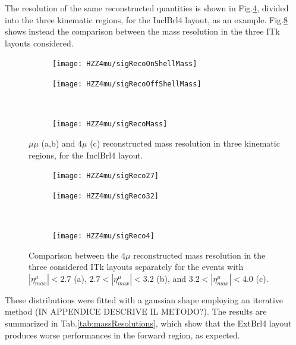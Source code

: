 \documentclass[a4paper,twoside,12pt]{article}
\begin{document}
 The resolution of the same reconstructed quantities is shown in Fig.\ref{fig:HZZ4mu:massResolution}, divided into the three kinematic regions, for the InclBrl4 layout, as an example. Fig.\ref{fig:HZZ4mu:layoutMassResolution} shows instead the comparison between the mass resolution in the three ITk layouts considered.\\

\begin{figure}
\begin{subfigure}{.5\linewidth}
\texttt{[image: HZZ4mu/sigRecoOnShellMass]}
\caption{}
\label{fig:HZZ4mu:sigRecoOnShellMass}
\end{subfigure}
\begin{subfigure}{.5\linewidth}
\centering
\texttt{[image: HZZ4mu/sigRecoOffShellMass]}
\caption{}
\label{fig:HZZ4mu:sigRecoOffShell}
\end{subfigure}\\[1ex]
\begin{subfigure}{\linewidth}
\centering
\texttt{[image: HZZ4mu/sigRecoMass]}
\caption{}
\label{fig:HZZ4mu:sigRecoMass}
\end{subfigure}
\caption{$\mu\mu$ (a,b) and $4\mu$ (c) reconstructed  mass resolution in three kinematic regions, 
		for the InclBrl4 layout.}
\label{fig:HZZ4mu:massResolution}
\end{figure}

\begin{figure}
\begin{subfigure}{.5\linewidth}
\texttt{[image: HZZ4mu/sigReco27]}
\caption{}
\label{fig:HZZ4mu:sigReco27}
\end{subfigure}
\begin{subfigure}{.5\linewidth}
\centering
\texttt{[image: HZZ4mu/sigReco32]}
\caption{}
\label{fig:HZZ4mu:sigReco32}
\end{subfigure}\\[1ex]
\begin{subfigure}{\linewidth}
\centering
\texttt{[image: HZZ4mu/sigReco4]}
\caption{}
\label{fig:HZZ4mu:sigReco4}
\end{subfigure}
\caption{Comparison between the $4\mu$ reconstructed mass resolution in the
three considered ITk layouts separately for the events with $|\eta^\mu_{max}| < 2.7$ (a),
	$2.7 < |\eta^\mu_{max}| < 3.2$ (b), and $3.2 < |\eta^\mu_{max}| < 4.0$ (c).}
\label{fig:HZZ4mu:layoutMassResolution}
\end{figure}

These distributions were fitted with a gaussian shape employing an iterative method 
(IN APPENDICE DESCRIVE IL METODO?). The results are summarized in 
Tab.\ref{tab:massResolutions}, which show that the ExtBrl4 layout produces worse performances in the forward region, as
expected. \\
\end{document}
